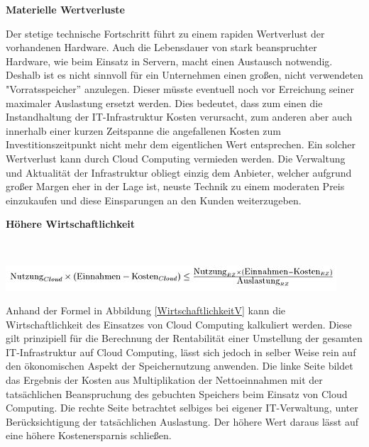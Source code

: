 \documentclass[13pt,a4paper,bibliography=totocnumbered,listof=totocnumbered]{scrartcl}
\begin{document}
\textbf{Materielle Wertverluste}

Der stetige technische Fortschritt führt zu einem rapiden Wertverlust der vorhandenen Hardware. Auch die Lebensdauer von stark beanspruchter Hardware, wie beim Einsatz in Servern, macht einen Austausch notwendig. Deshalb ist es nicht sinnvoll für ein Unternehmen einen großen, nicht verwendeten "Vorratsspeicher'' anzulegen. Dieser müsste eventuell noch vor Erreichung seiner maximaler Auslastung ersetzt werden. Dies bedeutet, dass zum einen die Instandhaltung der IT-Infrastruktur Kosten verursacht, zum anderen aber auch innerhalb einer kurzen Zeitspanne die angefallenen Kosten zum Investitionszeitpunkt nicht mehr dem eigentlichen Wert entsprechen. Ein solcher Wertverlust kann durch Cloud Computing vermieden werden. Die Verwaltung und Aktualität der Infrastruktur obliegt einzig dem Anbieter, welcher aufgrund großer Margen eher in der Lage ist, neuste Technik zu einem moderaten Preis einzukaufen und diese Einsparungen an den Kunden weiterzugeben.

\textbf{Höhere Wirtschaftlichkeit}

\vspace{1em}
$\;$\\
\begin{minipage}{\linewidth}
	\centering
	\includegraphics[width=1.0\linewidth]{./img/Wirtschaftlichkeit.jpg}
 	\label{WirtschaftlichkeitV}
\end{minipage}
\vspace{1em}

Anhand der Formel in Abbildung \ref{WirtschaftlichkeitV} kann die Wirtschaftlichkeit des Einsatzes von Cloud Computing kalkuliert werden. Diese gilt prinzipiell für die Berechnung der Rentabilität einer Umstellung der gesamten IT-Infrastruktur auf Cloud Computing, lässt sich jedoch in selber Weise rein auf den ökonomischen Aspekt der Speichernutzung anwenden. Die linke Seite bildet das Ergebnis der Kosten aus Multiplikation der Nettoeinnahmen mit der tatsächlichen Beanspruchung des gebuchten Speichers beim Einsatz von Cloud Computing. Die rechte Seite betrachtet selbiges bei eigener IT-Verwaltung, unter Berücksichtigung der tatsächlichen Auslastung. Der höhere Wert daraus lässt auf eine höhere Kostenersparnis schließen.\\
\cite{33} \cite[S. 71ff.]{44}
\end{document}
